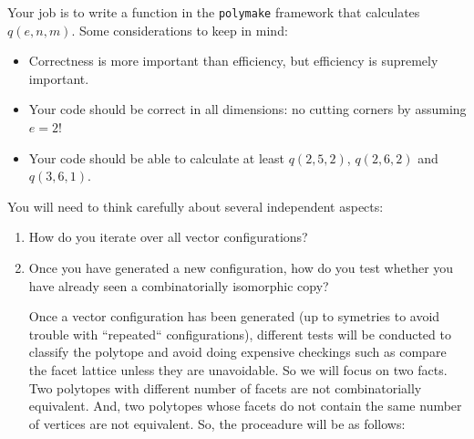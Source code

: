\documentclass[11pt]{amsart}
\begin{document}
\bigskip
Your job is to write a function in the \texttt{polymake} framework that calculates $q(e,n,m)$. Some considerations to keep in mind:
\begin{itemize}
\item Correctness is more important than efficiency, but efficiency is supremely important.
\item Your code should be correct in all dimensions: no cutting corners by assuming $e=2$!
\item Your code should be able to calculate at least $q(2,5,2)$, $q(2,6,2)$ and $q(3,6,1)$.
\end{itemize}
You will need to think carefully about several independent aspects:
\begin{enumerate}
\item How do you iterate over all vector configurations?
\item Once you have generated a new configuration, how do you test whether you have already seen a combinatorially isomorphic copy?

Once a vector configuration has been generated (up to symetries to avoid trouble with ``repeated`` configurations), different tests will be conducted to classify the polytope and avoid doing expensive checkings such as compare the facet lattice unless they are unavoidable. So we will focus on two facts. Two polytopes with different number of facets are not combinatorially equivalent. And, two polytopes whose facets do not contain the same number of vertices are not equivalent. So, the proceadure will be as follows:


\end{enumerate}
\end{document}
